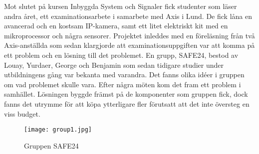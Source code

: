 



\begin{abstracts}        %
Mot slutet på kursen Inbyggda System och Signaler fick studenter som läser andra året, ett examinationsarbete i samarbete med Axis i Lund. De fick låna en avancerad och en kostsam IP-kamera, samt ett litet elektriskt kit med en mikroprocessor och några sensorer. Projektet inleddes med en föreläsning från två Axis-anställda som sedan klargjorde att examinationsuppgiften var att komma på ett problem och en lösning till det problemet. En grupp, SAFE24, bestod av Louay, Yurdaer, George och Benjamin som sedan tidigare studier under utbildningens gång var bekanta med varandra. Det fanns olika idéer i gruppen om vad problemet skulle vara. Efter några möten kom det fram ett problem i samhället. Lösningen byggde främst på de komponenter som gruppen fick, dock fanns det utrymme för att köpa ytterligare fler förutsatt att det inte översteg en viss budget.



\begin{figure}[h]
  \texttt{[image: group1.jpg]}
  \caption{Gruppen SAFE24}
  \label{fig:group1}
\end{figure}


\end{abstracts}


